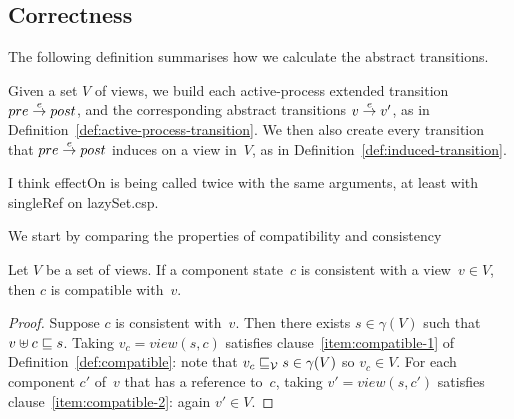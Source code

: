 
\subsection{Correctness}
\label{sec:views-correctness}


The following definition summarises how we calculate the abstract transitions.

\begin{definition}
\label{def:abstract-transition}
Given a set $V$ of views, we build each active-process extended transition
$pre \stackrel{e}\rightarrow post$, and the corresponding abstract transitions $v \stackrel{e}\rightarrow
v'$, as in Definition~\ref{def:active-process-transition}.
%
We then also create every transition that $pre \stackrel{e}\rightarrow post$ induces on a
view in~$V$, as in Definition~\ref{def:induced-transition}. 
\end{definition}

\begin{improve}
\framebox{***} I think effectOn is being called twice with the same arguments,
at least with singleRef on lazySet.csp. 
\end{improve}

We start by comparing the properties of compatibility and consistency
%
\begin{lemma}
\label{lem:consistent-implies-compatible}
Let $V$ be a set of views.
If a component state~$c$ is consistent with a view~$v \in V$, then
$c$ is compatible with~$v$. 
\end{lemma}
%
\begin{proof}
Suppose $c$ is consistent with~$v$.  Then there exists $s \in \gamma(V)$ such
that $v \uplus c \sqsubseteq s$.  Taking $v_c = view(s, c)$ satisfies
clause~\ref{item:compatible-1} of Definition~\ref{def:compatible}: note that
$v_c \sqsubseteq_{\mathcal{V}} s \in \gamma(V)$ so $v_c \in V$.  For each component $c'$ of~$v$
that has a reference to~$c$, taking $v' = view(s,c')$ satisfies
clause~\ref{item:compatible-2}: again $v' \in V$.
\end{proof}

